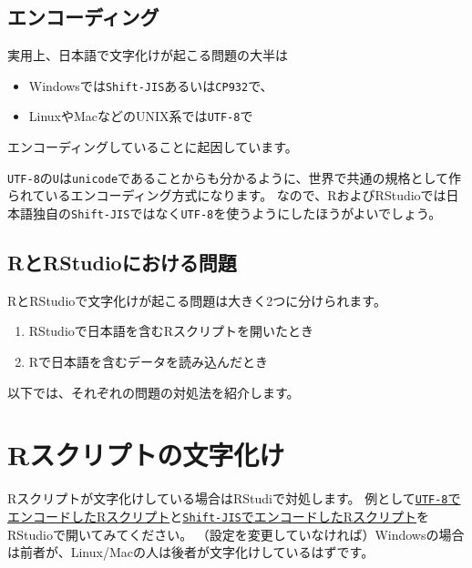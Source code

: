 \documentclass[]{bxjsreport}
\providecommand{\tightlist}{%
  \setlength{\itemsep}{0pt}\setlength{\parskip}{0pt}}
\let\asdf\section
\renewcommand{\section}{\chapter}
\let\asdff\subsection
\renewcommand{\subsection}{\asdf}
\renewcommand{\subsubsection}{\asdff}
\begin{document}
\hypertarget{ux30a8ux30f3ux30b3ux30fcux30c7ux30a3ux30f3ux30b0}{%
\subsubsection{エンコーディング}\label{ux30a8ux30f3ux30b3ux30fcux30c7ux30a3ux30f3ux30b0}}

実用上、日本語で文字化けが起こる問題の大半は

\begin{itemize}
\tightlist
\item
  Windowsでは\texttt{Shift-JIS}あるいは\texttt{CP932}で、
\item
  LinuxやMacなどのUNIX系では\texttt{UTF-8}で
\end{itemize}

エンコーディングしていることに起因しています。

\texttt{UTF-8}の\texttt{U}は\texttt{unicode}であることからも分かるように、世界で共通の規格として作られているエンコーディング方式になります。
なので、RおよびRStudioでは日本語独自の\texttt{Shift-JIS}ではなく\texttt{UTF-8}を使うようにしたほうがよいでしょう。

\hypertarget{rux3068rstudioux306bux304aux3051ux308bux554fux984c}{%
\subsubsection{RとRStudioにおける問題}\label{rux3068rstudioux306bux304aux3051ux308bux554fux984c}}

RとRStudioで文字化けが起こる問題は大きく2つに分けられます。

\begin{enumerate}
\def\labelenumi{\arabic{enumi}.}
\tightlist
\item
  RStudioで日本語を含むRスクリプトを開いたとき
\item
  Rで日本語を含むデータを読み込んだとき
\end{enumerate}

以下では、それぞれの問題の対処法を紹介します。

\hypertarget{rux30b9ux30afux30eaux30d7ux30c8ux306eux6587ux5b57ux5316ux3051}{%
\subsection{Rスクリプトの文字化け}\label{rux30b9ux30afux30eaux30d7ux30c8ux306eux6587ux5b57ux5316ux3051}}

Rスクリプトが文字化けしている場合はRStudiで対処します。
例として\href{script/script_utf8.R}{\texttt{UTF-8}でエンコードしたRスクリプト}と\href{script/script_sjis.R}{\texttt{Shift-JIS}でエンコードしたRスクリプト}をRStudioで開いてみてください。
（設定を変更していなければ）Windowsの場合は前者が、Linux/Macの人は後者が文字化けしているはずです。
\end{document}
